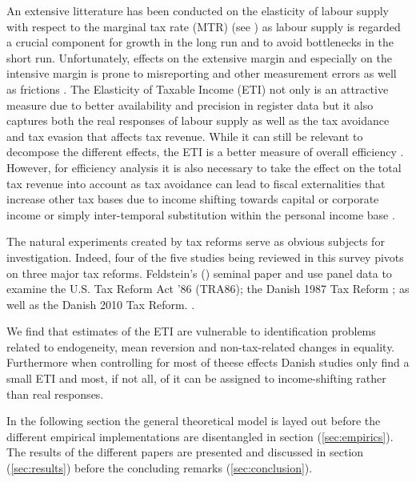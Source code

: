 An extensive litterature has been conducted on the elasticity of labour supply with respect to the marginal tax rate (MTR) (see \cite{chetty2012bounds}) as labour supply is regarded a crucial component for growth in the long run and to avoid bottlenecks in the short run. Unfortunately, effects on the extensive margin and especially on the intensive margin is prone to misreporting and other measurement errors as well as frictions \citep{chetty2011adjustment}. The Elasticity of Taxable Income (ETI) not only is an attractive measure due to better availability and precision in register data but it also captures both the real responses of labour supply as well as the tax avoidance and tax evasion that affects tax revenue. While it can still be relevant to decompose the different effects, the ETI is a better measure of overall efficiency \citep{feldstein1999tax}. However, for efficiency analysis it is also necessary to take the effect on the total tax revenue into account as tax avoidance can lead to fiscal externalities that increase other tax bases due to income shifting towards capital or corporate income or simply inter-temporal substitution within the personal income base \citep{goolsbee2000happens,kreiner2014year}.

The natural experiments created by tax reforms serve as obvious subjects for investigation. Indeed, four of the five studies being reviewed in this survey pivots on three major tax reforms. Feldstein's (\citeyear{feldstein1995effect}) seminal paper and \citet{gruber2002elasticity} use panel data to examine the U.S. Tax Reform Act '86 (TRA86); the Danish 1987 Tax Reform \citep{kleven2014estimating}; as well as the Danish 2010 Tax Reform. \citep{kreiner2014year}.

We find that estimates of the ETI are vulnerable to identification problems related to endogeneity, mean reversion and non-tax-related changes in equality. Furthermore when controlling for most of theese effects Danish studies only find a small ETI and most, if not all, of it can be assigned to income-shifting rather than real responses.

In the following section the general theoretical model is layed out before the different empirical implementations are disentangled in section (\ref{sec:empirics}). The results of the different papers are presented and discussed in section (\ref{sec:results}) before the concluding remarks (\ref{sec:conclusion}).
